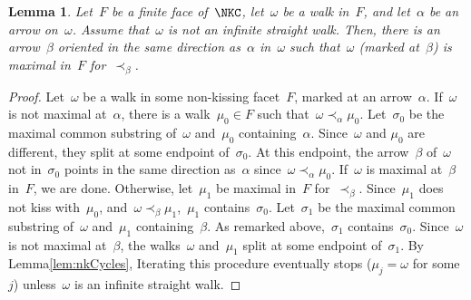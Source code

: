 \documentclass{amsart}
\newtheorem{lemma}[theorem]{Lemma}
\theoremstyle{definition}
\begin{document}
\begin{lemma}\label{lem:ExistenceOfDistinguishedArrows}
Let~$F$ be a finite face of~$\NKC$, let~$\omega$ be a walk in~$F$, and let~$\alpha$ be an arrow on~$\omega$.
Assume that~$\omega$ is not an infinite straight walk.
Then, there is an arrow~$\beta$ oriented in the same direction as~$\alpha$ in~$\omega$ such that~$\omega$ (marked at~$\beta$) is maximal in~$F$ for~$\prec_\beta$.
\end{lemma}

\begin{proof}
Let~$\omega$ be a walk in some non-kissing facet~$F$, marked at an arrow~$\alpha$.
If~$\omega$ is not maximal at~$\alpha$, there is a walk~$\mu_0\in F$ such that~$\omega\prec_\alpha \mu_0$.
Let~$\sigma_0$ be the maximal common substring of~$\omega$ and~$\mu_0$ containing~$\alpha$.
Since~$\omega$ and $\mu_0$ are different, they split at some endpoint of~$\sigma_0$.
At this endpoint, the arrow~$\beta$ of~$\omega$ not in~$\sigma_0$ points in the same direction as~$\alpha$ since~$\omega \prec_\alpha \mu_0$.
If~$\omega$ is maximal at~$\beta$ in~$F$, we are done.
Otherwise, let~$\mu_1$ be maximal in~$F$ for~$\prec_\beta$.
Since~$\mu_1$ does not kiss with~$\mu_0$, and~$\omega\prec_\beta\mu_1$,~$\mu_1$ contains~$\sigma_0$.
Let~$\sigma_1$ be the maximal common substring of~$\omega$ and~$\mu_1$ containing~$\beta$.
As remarked above,~$\sigma_1$ contains~$\sigma_0$.
Since~$\omega$ is not maximal at~$\beta$, the walks~$\omega$ and~$\mu_1$ split at some endpoint of~$\sigma_1$.
By Lemma\ref{lem:nkCycles}, Iterating this procedure eventually stops ($\mu_j=\omega$ for some $j$) unless~$\omega$ is an infinite straight walk.
\end{proof}
\end{document}
